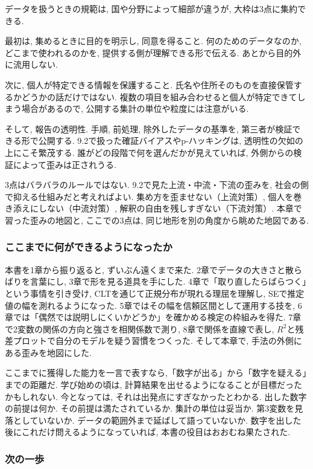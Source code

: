 データを扱うときの規範は, 国や分野によって細部が違うが, 大枠は3点に集約できる.

最初は, 集めるときに目的を明示し, 同意を得ること.
何のためのデータなのか, どこまで使われるのかを, 提供する側が理解できる形で伝える.
あとから目的外に流用しない.

次に, 個人が特定できる情報を保護すること.
氏名や住所そのものを直接保管するかどうかの話だけではない.
複数の項目を組み合わせると個人が特定できてしまう場合があるので, 公開する集計の単位や粒度には注意がいる.

そして, 報告の透明性. 手順, 前処理, 除外したデータの基準を, 第三者が検証できる形で公開する.
9.2で扱った確証バイアスやp-ハッキングは, 透明性の欠如の上にこそ繁茂する.
誰がどの段階で何を選んだかが見えていれば, 外側からの検証によって歪みは正されうる.

3点はバラバラのルールではない.
9.2で見た上流・中流・下流の歪みを, 社会の側で抑える仕組みだと考えればよい.
集め方を歪ませない（上流対策）, 個人を巻き添えにしない（中流対策）, 解釈の自由を残しすぎない（下流対策）.
本章で習った歪みの地図と, ここでの3点は, 同じ地形を別の角度から眺めた地図である.

\subsubsection*{ここまでに何ができるようになったか}

本書を1章から振り返ると, ずいぶん遠くまで来た.
2章でデータの大きさと散らばりを言葉にし, 3章で形を見る道具を手にした.
4章で「取り直したらばらつく」という事情を引き受け, CLTを通じて正規分布が現れる理屈を理解し, SEで推定値の幅を測れるようになった.
5章ではその幅を信頼区間として運用する技を, 6章では「偶然では説明しにくいかどうか」を確かめる検定の枠組みを得た.
7章で2変数の関係の方向と強さを相関係数で測り, 8章で関係を直線で表し, $R^2$と残差プロットで自分のモデルを疑う習慣をつくった.
そして本章で, 手法の外側にある歪みを地図にした.

ここまでに獲得した能力を一言で表すなら,「数字が出る」から「数字を疑える」までの距離だ.
学び始めの頃は, 計算結果を出せるようになることが目標だったかもしれない.
今となっては, それは出発点にすぎなかったとわかる.
出した数字の前提は何か. その前提は満たされているか. 集計の単位は妥当か. 第3変数を見落としていないか. データの範囲外まで延ばして語っていないか.
数字を出した後にこれだけ問えるようになっていれば, 本書の役目はおおむね果たされた.

\subsubsection*{次の一歩}

